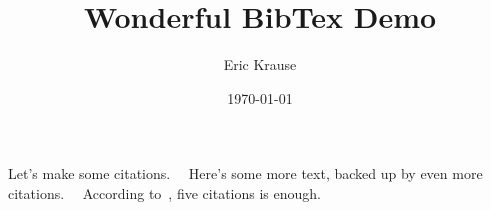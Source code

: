 \documentclass{article}
\begin{document}
\title{Wonderful BibTex Demo}
\author{Eric Krause}
\date{\today}
\maketitle
Let's make some citations.~\cite{Nobody06}~\cite{Meyer2000}   Here's some more text, backed up by even more citations.~\cite{Codishetal2000}~\cite{Huetal2000}  According to~\cite{Conway2000}, five citations is enough.



\end{document}
